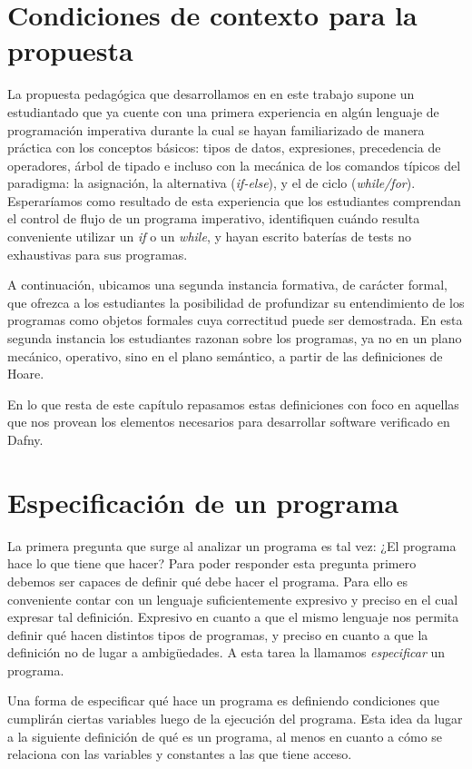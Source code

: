 \documentclass[12pt, a4paper, openany, fleqn]{book}
\begin{document}
    \section{Condiciones de contexto para la propuesta}
    La propuesta pedagógica que desarrollamos en en este trabajo supone un estudiantado que ya cuente con una primera experiencia en algún lenguaje de programación imperativa durante la cual se hayan familiarizado de manera práctica con los conceptos básicos: tipos de datos, expresiones, precedencia de operadores, árbol de tipado e incluso con la mecánica de los comandos típicos del paradigma: la asignación, la alternativa (\textit{if-else}), y el de ciclo (\textit{while/for}). Esperaríamos como resultado de esta experiencia que los estudiantes comprendan el control de flujo de un programa imperativo, identifiquen cuándo resulta conveniente utilizar un \textit{if} o un \textit{while}, y hayan escrito baterías de tests no exhaustivas para sus programas.

    A continuación, ubicamos una segunda instancia formativa, de carácter formal, que ofrezca a los estudiantes la posibilidad de profundizar su entendimiento de los programas como objetos formales cuya correctitud puede ser demostrada.
    En esta segunda instancia los estudiantes razonan sobre los programas, ya no en un plano mecánico, operativo, sino en el plano semántico, a partir de las definiciones de Hoare.

    En lo que resta de este capítulo repasamos estas definiciones con foco en aquellas que nos provean los elementos necesarios para desarrollar software verificado en Dafny.

    \section{Especificación de un programa}
    La primera pregunta que surge al analizar un programa es tal vez: ¿El programa hace lo que tiene que hacer? Para poder responder esta pregunta primero debemos ser capaces de definir qué debe hacer el programa. Para ello es conveniente contar con un lenguaje suficientemente expresivo y preciso en el cual expresar tal definición. Expresivo en cuanto a que el mismo lenguaje nos permita definir qué hacen distintos tipos de programas, y preciso en cuanto a que la definición no de lugar a ambigüedades.
    A esta tarea la llamamos \textit{especificar} un programa.

    Una forma de especificar qué hace un programa es definiendo condiciones que cumplirán ciertas variables luego de la ejecución del programa. Esta idea da lugar a la siguiente definición de qué es un programa, al menos en cuanto a cómo se relaciona con las variables y constantes a las que tiene acceso.
\end{document}
